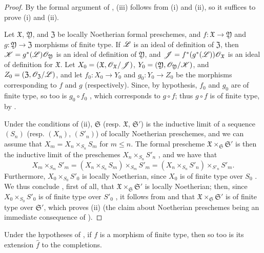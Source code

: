 \begin{proof}
By the formal argument of , (iii) follows from (i) and (ii), so it suffices to prove (i) and (ii).

Let $\mathfrak{X}$, $\mathfrak{Y}$, and $\mathfrak{Z}$ be locally Noetherian formal preschemes, and $f:\mathfrak{X}\to\mathfrak{Y}$ and $g:\mathfrak{Y}\to\mathfrak{Z}$ morphisms of finite type.
If $\mathscr{L}$ is an ideal of definition of $\mathfrak{Z}$, then $\mathscr{K}=g^*(\mathscr{L})\mathscr{O}_\mathfrak{Y}$ is an ideal of definition of $\mathfrak{Y}$, and $\mathscr{J}=f^*(g^*(\mathscr{L}))\mathscr{O}_\mathfrak{X}$ is an ideal of definition for $\mathfrak{X}$.
Let $X_0=(\mathfrak{X},\mathscr{O}_\mathfrak{X}/\mathscr{J})$, $Y_0=(\mathfrak{Y},\mathscr{O}_\mathfrak{Y}/\mathscr{K})$, and $Z_0=(\mathfrak{Z},\mathscr{O}_\mathfrak{Z}/\mathscr{L})$, and let $f_0:X_0\to Y_0$ and $g_0:Y_0\to Z_0$ be the morphisms corresponding to $f$ and $g$ (respectively).
Since, by hypothesis, $f_0$ and $g_0$ are of finite type, so too is $g_0\circ f_0$ , which corresponds to $g\circ f$;
thus $g\circ f$ is of finite type, by .

Under the conditions of (ii), $\mathfrak{S}$ (resp. $\mathfrak{X}$, $\mathfrak{S}'$) is the inductive limit of a sequence $(S_n)$ (resp. $(X_n)$, $(S'_n)$) of locally Noetherian preschemes, and we can assume  that $X_m=X_n\times_{S_n}S_m$ for $m\leq n$.
The formal prescheme $\mathfrak{X}\times_\mathfrak{S}\mathfrak{S}'$ is then the inductive limit of the preschemes $X_n\times_{S_n}S'_n$ , and we have that
\[
    X_m\times_{S_m}S'_m = (X_n\times_{S_n}S_m)\times_{S_m}S'_m = (X_n\times_{S_n}S'_n)\times_{S'_n}S'_m.
\]
Furthermore, $X_0\times_{S_0}S'_0$ is locally Noetherian, since $X_0$ is of finite type over $S_0$ .
We thus conclude , first of all, that $\mathfrak{X}\times_\mathfrak{S}\mathfrak{S}'$ is locally Noetherian;
then, since $X_0\times_{S_0}S'_0$ is of finite type over $S'_0$ , it follows from  and  that $\mathfrak{X}\times_\mathfrak{S}\mathfrak{S}'$ is of finite type over $\mathfrak{S}'$, which proves (ii) (the claim about Noetherian preschemes being an immediate consequence of ).
\end{proof}

\begin{corollary}[10.13.6]
\label{I.10.13.6}
Under the hypotheses of , if $f$ is a morphism of finite type, then so too is its extension $\widehat{f}$ to the completions.
\end{corollary}

